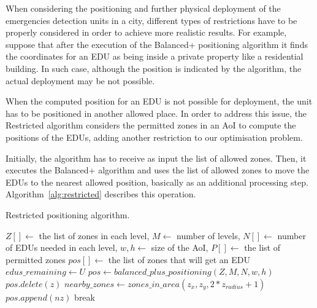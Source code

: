 \begin{refsection}
When considering the positioning and further physical deployment of the emergencies detection units in a city, different types of restrictions have to be properly considered in order to achieve more realistic results. For example, suppose that after the execution of the Balanced+ positioning algorithm it finds the coordinates for an EDU as being inside a private property like a residential building. In such case, although the position is indicated by the algorithm, the actual deployment may be not possible.

When the computed position for an EDU is not possible for deployment, the unit has to be positioned in another allowed place. In order to address this issue, the Restricted algorithm considers the permitted zones in an AoI to compute the positions of the EDUs, adding another restriction to our optimisation problem. 

Initially, the algorithm has to receive as input the list of allowed zones. Then, it executes the Balanced+ algorithm and uses the list of allowed zones to move the EDUs to the nearest allowed position, basically as an additional processing step. Algorithm~\ref{alg:restricted} describes this operation. 

\begin{algorithm}[ht]
  \caption{Restricted positioning algorithm.}\label{alg:restricted}
  \begin{algorithmic}
    \REQUIRE $Z[] \gets$ the list of zones in each level, $M \gets$ number of levels, $N[] \gets$ number of EDUs needed in each level, $w, h \gets$ size of the AoI, $P[] \gets$ the list of permitted zones
    \ENSURE $pos[] \gets$ the list of zones that will get an EDU
    \STATE $edus\_remaining \gets U$
      \STATE $pos \gets balanced\_plus\_positioning(Z, M, N, w, h)$
          \STATE $pos.delete(z)$
          \STATE $nearby\_zones \gets zones\_in\_area(z_x, z_y, 2 * z_{radius} + 1)$
              \STATE $pos.append(nz)$
              \STATE break
            \ENDIF
          \ENDFOR
        \ENDIF
      \ENDFOR
    \ENDWHILE
  \end{algorithmic}
\end{algorithm}


\end{refsection}
